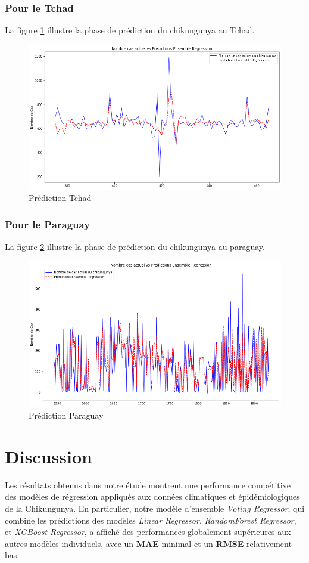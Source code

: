 \subsubsection{Pour le Tchad}
La figure \ref{fig:predictionchad} illustre la phase de prédiction du chikungunya au Tchad. 
\begin{figure}[h!]
	\centering
	\includegraphics[width=0.85\linewidth]{images/prediction_chad}
	\caption{Prédiction Tchad}
	\label{fig:predictionchad}
\end{figure}
\subsubsection{Pour le Paraguay}
La figure \ref{fig:predictionparaguay} illustre la phase de prédiction du chikungunya au paraguay. 
\begin{figure}[h!]
	\centering
	\includegraphics[width=0.85\linewidth]{images/prediction_paraguay}
	\caption{Prédiction Paraguay}
	\label{fig:predictionparaguay}
\end{figure}
\newpage
\section{Discussion}

Les résultats obtenus dans notre étude montrent une performance compétitive des modèles de régression appliqués aux données climatiques et épidémiologiques de la Chikungunya. En particulier, notre modèle d'ensemble \textit{Voting Regressor}, qui combine les prédictions des modèles \textit{Linear Regressor}, \textit{RandomForest Regressor}, et \textit{XGBoost Regressor}, a affiché des performances globalement supérieures aux autres modèles individuels, avec un \textbf{MAE} minimal et un \textbf{RMSE} relativement bas.

